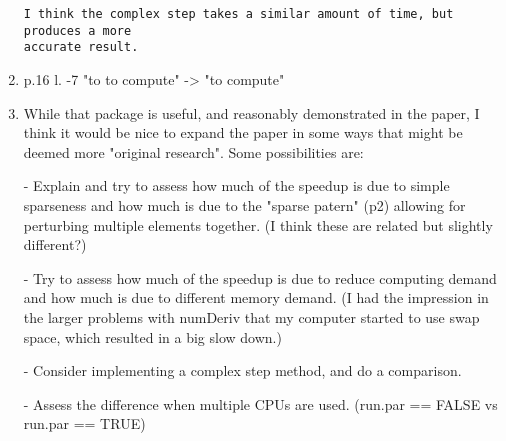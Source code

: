 \documentclass{article}
\newenvironment{revQuote}{\itshape}{\vspace{\baselineskip}}
\newenvironment{response}{\normalfont}{\vspace{\baselineskip}}
\begin{document}
\begin{enumerate}
\begin{revQuote}
\begin{verbatim}
I think the complex step takes a similar amount of time, but produces a more
accurate result.

\end{verbatim}

  \end{revQuote}
  
  \begin{response}
    
  \end{response}

\item\begin{revQuote}

 p.16  l. -7 "to to compute" -> "to compute"


  \end{revQuote}
  
  \begin{response}
    
  \end{response}

\item\begin{revQuote}

While that package is useful, and reasonably demonstrated in the paper,
I think it would be nice to expand the paper in some ways that might be
deemed more "original research". Some possibilities are:

 - Explain and try to assess how much of the speedup is due to simple
sparseness and how much is due to the "sparse patern" (p2) allowing for
perturbing multiple elements together. (I think these are related but
slightly different?)
 
 - Try to assess how much of the speedup is due to reduce computing demand
and how much is due to different memory demand. (I had the impression in the
larger problems with numDeriv that my computer started to use swap space,
which resulted in a big slow down.)
 
 - Consider implementing a complex step method, and do a comparison.
 
 - Assess the difference when multiple CPUs are used. (run.par == FALSE vs
run.par == TRUE)

  \end{revQuote}
  
  \begin{response}
    
  \end{response}



  


\end{enumerate}
\end{document}
